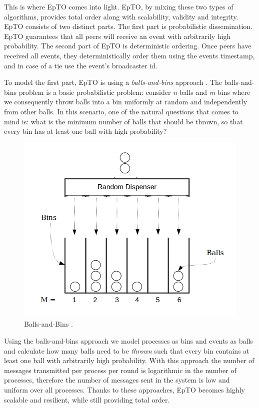 \documentclass[10pt,conference,a4paper]{IEEEtran}
\begin{document}
\par
This is where EpTO comes into light. EpTO, by mixing these two types of algorithms, provides total order along with scalability, validity and integrity. 
EpTO consists of two distinct parts. The first part is probabilistic dissemination. EpTO guarantees that all peers will receive an event with arbitrarily high probability. The second part of EpTO is deterministic ordering. Once peers have received all events, they deterministically order them using the events timestamp, and in case of a tie use the event's broadcaster id.
\par
To model the first part, EpTO is using a \textit{balls-and-bins} approach \autocite{Koldehofe02simplegossiping}. The balls-and-bins problem is a basic probabilistic problem: consider \textit{n} balls and \textit{m} bins where we consequently throw balls into a bin uniformly at random and independently from other balls. In this scenario, one of the natural questions that comes to mind is: what is the minimum number of balls that should be thrown, so that every bin has at least one ball with high probability?
\begin{figure}
\includegraphics[width=\linewidth]{figures/BnB.jpeg}
\caption{Balls-and-Bins \autocite{bnb}.}
\label{fig:balls-and-bins}
\end{figure}
\par
Using the balls-and-bins approach we model processes as bins and events as balls and calculate how many balls need to be \textit{thrown} such that every bin contains at least one ball with arbitrarily high probability. With this approach the number of messages transmitted per process per round is logarithmic in the number of processes, therefore the number of messages sent in the system is low and uniform over all processes. Thanks to these approaches, EpTO becomes highly scalable and resilient, while still providing total order.
\end{document}
